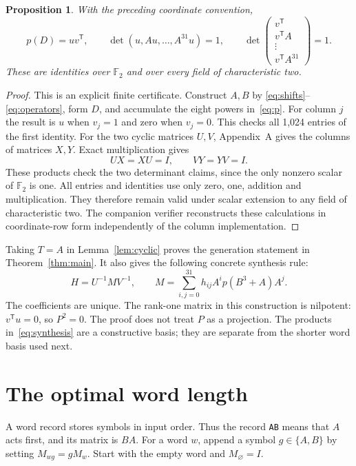\documentclass[11pt,a4paper]{article}
\newtheorem{proposition}[theorem]{Proposition}
\theoremstyle{definition}\newtheorem{definition}[theorem]{Definition}
\newcommand{\F}{\mathbb F_2}
\begin{document}
\begin{proposition}\label{prop:certificate}
With the preceding coordinate convention,
\begin{equation}\label{eq:rankone}
 p(D)=uv^{\mathsf T},\qquad
 \det(u,Au,\ldots,A^{31}u)=1,\qquad
 \det\begin{pmatrix}v^{\mathsf T}\\v^{\mathsf T}A\\\vdots\\v^{\mathsf T}A^{31}\end{pmatrix}=1.
\end{equation}
These are identities over $\F$ and over every field of characteristic two.
\end{proposition}
\begin{proof}
This is an explicit finite certificate. Construct $A,B$ by
\eqref{eq:shifts}--\eqref{eq:operators}, form $D$, and accumulate the eight
powers in~\eqref{eq:p}. For column $j$ the result is $u$ when $v_j=1$ and
zero when $v_j=0$. This checks all 1,024 entries of the first identity.
For the two cyclic matrices $U,V$, Appendix~A gives the columns of
matrices $X,Y$. Exact multiplication gives
\begin{equation}\label{eq:inverses}
 UX=XU=I,\qquad VY=YV=I.
\end{equation}
These products check the two determinant claims, since the only nonzero
scalar of $\F$ is one. All entries and identities use only zero, one,
addition and multiplication. They therefore remain valid under scalar
extension to any field of characteristic two. The companion verifier
reconstructs these calculations in coordinate-row form independently of
the column implementation.
\end{proof}

Taking $T=A$ in Lemma~\ref{lem:cyclic} proves the generation statement in
Theorem~\ref{thm:main}. It also gives the following concrete synthesis rule:
\begin{equation}\label{eq:synthesis}
 H=U^{-1}MV^{-1},\qquad
 M=\sum_{i,j=0}^{31}h_{ij}A^ip(B^3+A)A^j.
\end{equation}
The coefficients are unique. The rank-one matrix in this construction is
nilpotent: $v^{\mathsf T}u=0$, so $P^2=0$. The proof does not treat $P$ as
a projection. The products in~\eqref{eq:synthesis} are a constructive basis;
they are separate from the shorter word basis used next.

\section{The optimal word length}
A word record stores symbols in input order. Thus the record
\texttt{AB} means that $A$ acts first, and its matrix is $BA$.
For a word $w$, append a symbol $g\in\{A,B\}$ by setting
$M_{wg}=gM_w$. Start with the empty word and $M_{\varnothing}=I$.
\end{document}
